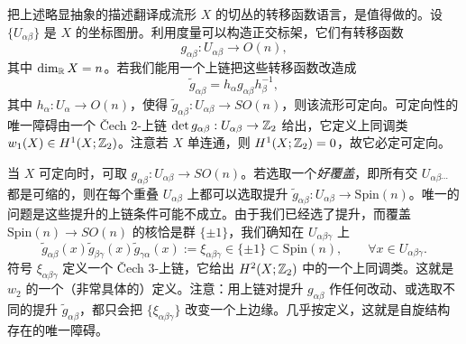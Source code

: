 把上述略显抽象的描述翻译成流形 $X$ 的切丛的转移函数语言，是值得做的。设 $\{U_{\alpha\beta}\}$ 是 $X$ 的坐标图册。利用度量可以构造正交标架，它们有转移函数
\begin{equation}
g_{\alpha\beta}:U_{\alpha\beta}\to O(n),
\tag{A.10}
\end{equation}
其中 $\dim_{\mathbb{R}}X=n$。若我们能用一个上链把这些转移函数改造成
\begin{equation}
\tilde g_{\alpha\beta}=h_{\alpha}g_{\alpha\beta}h_{\beta}^{-1},
\tag{A.11}
\end{equation}
其中 $h_{\alpha}:U_{\alpha}\to O(n)$，使得 $\tilde g_{\alpha\beta}:U_{\alpha\beta}\to SO(n)$，则该流形可定向。可定向性的唯一障碍由一个 Čech 2-上链 $\det g_{\alpha\beta}:U_{\alpha\beta}\to\mathbb{Z}_{2}$ 给出，它定义上同调类 $w_{1}(X)\in H^{1}(X;\mathbb{Z}_{2})$。注意若 $X$ 单连通，则 $H^{1}(X;\mathbb{Z}_{2})=0$，故它必定可定向。

当 $X$ 可定向时，可取 $g_{\alpha\beta}:U_{\alpha\beta}\to SO(n)$。若选取一个\emph{好覆盖}，即所有交 $U_{\alpha\beta\cdots}$ 都是可缩的，则在每个重叠 $U_{\alpha\beta}$ 上都可以选取提升 $\tilde g_{\alpha\beta}:U_{\alpha\beta}\to\mathrm{Spin}(n)$。唯一的问题是这些提升的上链条件可能不成立。由于我们已经选了提升，而覆盖 $\mathrm{Spin}(n)\to SO(n)$ 的核恰是群 $\{\pm1\}$，我们确知在 $U_{\alpha\beta\gamma}$ 上
\begin{equation}
\tilde g_{\alpha\beta}(x)\tilde g_{\beta\gamma}(x)\tilde g_{\gamma\alpha}(x)
:=\xi_{\alpha\beta\gamma}\in\{\pm1\}\subset\mathrm{Spin}(n),
\qquad\forall x\in U_{\alpha\beta\gamma}.
\tag{A.12}
\end{equation}
符号 $\xi_{\alpha\beta\gamma}$ 定义一个 Čech 3-上链，它给出 $H^{2}(X;\mathbb{Z}_{2})$ 中的一个上同调类。这就是 $w_{2}$ 的一个（非常具体的）定义。注意：用上链对提升 $g_{\alpha\beta}$ 作任何改动、或选取不同的提升 $\tilde g_{\alpha\beta}$，都只会把 $\{\xi_{\alpha\beta\gamma}\}$ 改变一个上边缘。几乎按定义，这就是自旋结构存在的唯一障碍。



